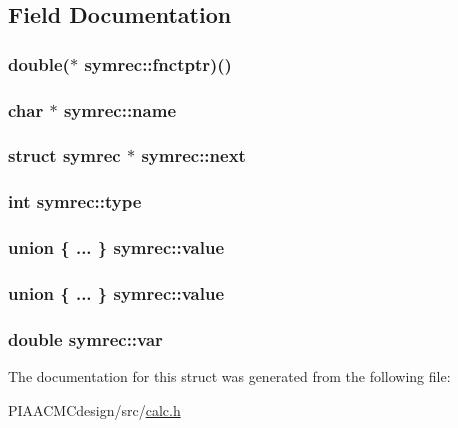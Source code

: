 \subsection{Field Documentation}
\hypertarget{structsymrec_a841939294a168dadc7dc230596f932ca}{
\subsubsection[{fnctptr}]{\setlength{\rightskip}{0pt plus 5cm}double($\ast$ symrec\+::fnctptr)()}}\label{structsymrec_a841939294a168dadc7dc230596f932ca}
\hypertarget{structsymrec_a202440ab579645f6c8296a45aa20d58d}{
\subsubsection[{name}]{\setlength{\rightskip}{0pt plus 5cm}char $\ast$ symrec\+::name}}\label{structsymrec_a202440ab579645f6c8296a45aa20d58d}
\hypertarget{structsymrec_ad421f0b40359009924d809424295fa8e}{
\subsubsection[{next}]{\setlength{\rightskip}{0pt plus 5cm}struct {\bf symrec} $\ast$ symrec\+::next}}\label{structsymrec_ad421f0b40359009924d809424295fa8e}
\hypertarget{structsymrec_a3ed0bae32ad0e16423a49153484094f8}{
\subsubsection[{type}]{\setlength{\rightskip}{0pt plus 5cm}int symrec\+::type}}\label{structsymrec_a3ed0bae32ad0e16423a49153484094f8}
\hypertarget{structsymrec_a6010894d0620b4f8aadf53477259e21a}{
\subsubsection[{value}]{\setlength{\rightskip}{0pt plus 5cm}union \{ ... \}   symrec\+::value}}\label{structsymrec_a6010894d0620b4f8aadf53477259e21a}
\hypertarget{structsymrec_aabe0b508928c6472fcbdf5071c33b61a}{
\subsubsection[{value}]{\setlength{\rightskip}{0pt plus 5cm}union \{ ... \}   symrec\+::value}}\label{structsymrec_aabe0b508928c6472fcbdf5071c33b61a}
\hypertarget{structsymrec_af3db0c7e569f93a9d7385d5b170578f8}{
\subsubsection[{var}]{\setlength{\rightskip}{0pt plus 5cm}double symrec\+::var}}\label{structsymrec_af3db0c7e569f93a9d7385d5b170578f8}


The documentation for this struct was generated from the following file\+:\begin{DoxyCompactItemize}
\item 
P\+I\+A\+A\+C\+M\+Cdesign/src/\hyperlink{PIAACMCdesign_2src_2calc_8h}{calc.\+h}\end{DoxyCompactItemize}

